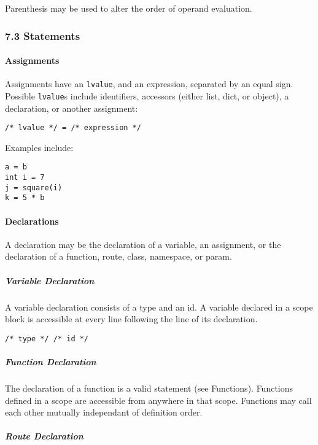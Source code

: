 Parenthesis may be used to alter the order of operand evaluation.

\subsubsection{7.3 Statements}\label{statements}

\paragraph{Assignments}\label{assignments}

Assignments have an \texttt{lvalue}, and an expression, separated by an
equal sign. Possible \texttt{lvalue}s include identifiers, accessors
(either list, dict, or object), a declaration, or another assignment:

\begin{verbatim}
/* lvalue */ = /* expression */
\end{verbatim}

Examples include:

\begin{verbatim}
a = b
int i = 7
j = square(i)
k = 5 * b
\end{verbatim}

\paragraph{Declarations}\label{declarations}

A declaration may be the declaration of a variable, an assignment, or
the declaration of a function, route, class, namespace, or param.

\subparagraph{Variable Declaration}\label{variable-declaration}

A variable declaration consists of a type and an id. A variable declared
in a scope block is accessible at every line following the line of its
declaration.

\begin{verbatim}
/* type */ /* id */
\end{verbatim}

\subparagraph{Function Declaration}\label{function-declaration}

The declaration of a function is a valid statement (see Functions).
Functions defined in a scope are accessible from anywhere in that scope.
Functions may call each other mutually independant of definition order.

\subparagraph{Route Declaration}\label{route-declaration}

